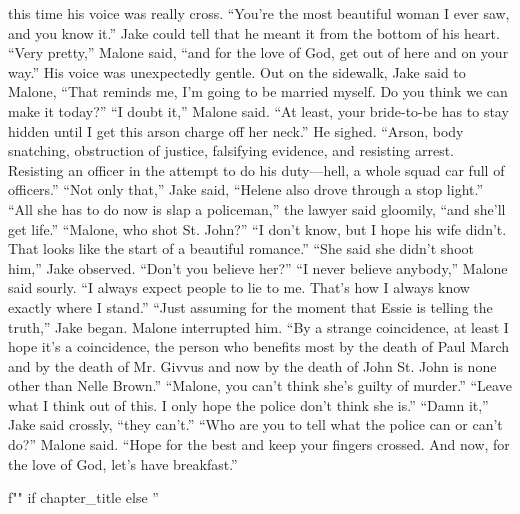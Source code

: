 \documentclass{novel}
\begin{document}
this time his voice was really cross. “You’re the most beautiful woman I ever saw, and you know it.” Jake could tell that he meant it from the bottom of his heart. “Very pretty,” Malone said, “and for the love of God, get out of here and on your way.” His voice was unexpectedly gentle. Out on the sidewalk, Jake said to Malone, “That reminds me, I’m going to be married myself. Do you think we can make it today?” “I doubt it,” Malone said. “At least, your bride-to-be has to stay hidden until I get this arson charge off her neck.” He sighed. “Arson, body snatching, obstruction of justice, falsifying evidence, and resisting arrest. Resisting an officer in the attempt to do his duty—hell, a whole squad car full of officers.” “Not only that,” Jake said, “Helene also drove through a stop light.” “All she has to do now is slap a policeman,” the lawyer said gloomily, “and she’ll get life.” “Malone, who shot St. John?” “I don’t know, but I hope his wife didn’t. That looks like the start of a beautiful romance.” “She said she didn’t shoot him,” Jake observed. “Don’t you believe her?” “I never believe anybody,” Malone said sourly. “I always expect people to lie to me. That’s how I always know exactly where I stand.” “Just assuming for the moment that Essie is telling the truth,” Jake began. Malone interrupted him. “By a strange coincidence, at least I hope it’s a coincidence, the person who benefits most by the death of Paul March and by the death of Mr. Givvus and now by the death of John St. John is none other than Nelle Brown.” “Malone, you can’t think she’s guilty of murder.” “Leave what I think out of this. I only hope the police don’t think she is.” “Damn it,” Jake said crossly, “they can’t.” “Who are you to tell what the police can or can’t do?” Malone said. “Hope for the best and keep your fingers crossed. And now, for the love of God, let’s have breakfast.”

\begin{ChapterStart}
\vspace{3\nbs}
f"" if chapter_title else ''
\end{ChapterStart}
\end{document}
